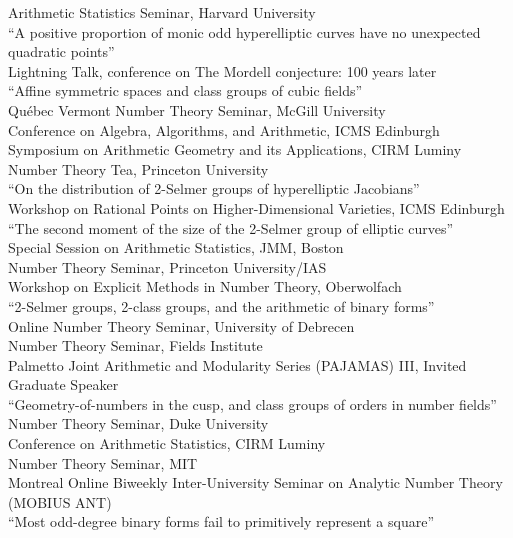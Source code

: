 \documentclass[11pt]{article} %
\begin{document}
Arithmetic Statistics Seminar, Harvard University \\
 ``A positive proportion of monic odd hyperelliptic curves have no unexpected quadratic points'' \\
Lightning Talk, conference on The Mordell conjecture: 100 years later \\
 ``Affine symmetric spaces and class groups of cubic fields''\\
Qu\'{e}bec Vermont Number Theory Seminar, McGill University \\
Conference on Algebra, Algorithms, and Arithmetic, ICMS Edinburgh \\
Symposium on Arithmetic Geometry and its Applications, CIRM Luminy \\
Number Theory Tea, Princeton University \\
 ``On the distribution of 2-Selmer groups of hyperelliptic Jacobians'' \\
Workshop on Rational Points on Higher-Dimensional Varieties, ICMS Edinburgh \\
 ``The second moment of the size of the 2-Selmer group of elliptic curves'' \\
Special Session on Arithmetic Statistics, JMM, Boston \\
Number Theory Seminar, Princeton University/IAS \\
Workshop on Explicit Methods in Number Theory, Oberwolfach \\
 ``2-Selmer groups, 2-class groups, and the arithmetic of binary forms'' \\
Online Number Theory Seminar, University of Debrecen \\
Number Theory Seminar, Fields Institute \\
Palmetto Joint Arithmetic and Modularity Series (PAJAMAS) III, Invited Graduate Speaker \\
 ``Geometry-of-numbers in the cusp, and class groups of orders in number fields'' \\
Number Theory Seminar, Duke University \\
Conference on Arithmetic Statistics, CIRM Luminy \\
Number Theory Seminar, MIT\\
Montreal Online Biweekly Inter-University Seminar on Analytic Number Theory (MOBIUS ANT) \\
 ``Most odd-degree binary forms fail to primitively represent a square'' \\
\end{document}
